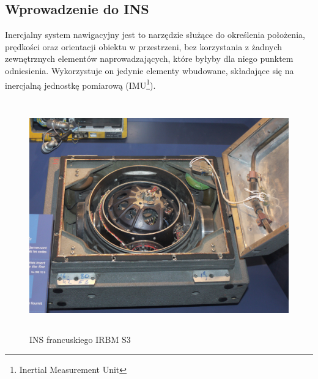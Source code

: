 \subsection{Wprowadzenie do INS}


Inercjalny system nawigacyjny jest to narzędzie służące do określenia położenia,
prędkości oraz orientacji obiektu w przestrzeni, bez korzystania z żadnych
zewnętrznych elementów naprowadzających, które byłyby dla niego punktem
odniesienia. Wykorzystuje on jedynie elementy wbudowane, składające się na
inercjalną jednostkę pomiarową (IMU\footnote{Inertial Measurement Unit}).
\begin{figure}[!ht]
 \centering
 \includegraphics[height=100mm]{../images/ch04/INS-zdjecie.jpg}
 \caption[INS francuskiego IRBM S3]{INS francuskiego IRBM S3\footnotemark}
 \label{fig:Zyrokompas}
\end{figure}


